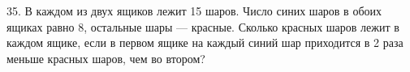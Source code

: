 35. В каждом из двух ящиков лежит 15 шаров. Число синих шаров в обоих ящиках равно 8, остальные шары --- красные. Сколько красных шаров лежит в каждом ящике, если в первом ящике на каждый синий шар приходится в 2 раза меньше красных шаров, чем во втором?\\
